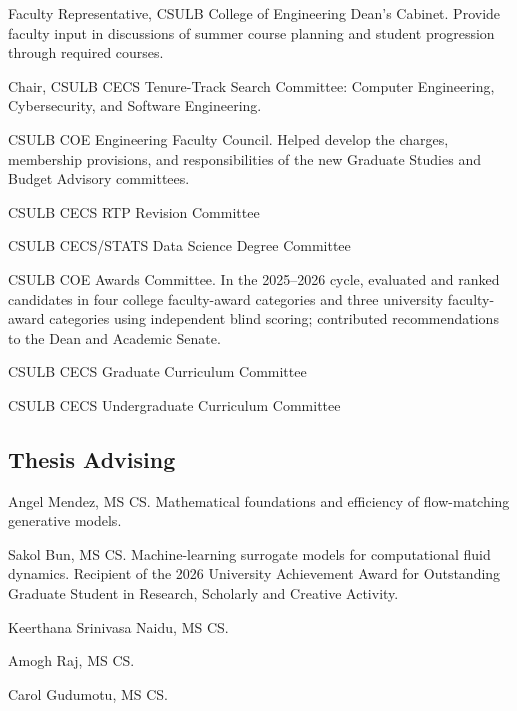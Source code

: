 \documentclass[11pt,letterpaper]{report}
\begin{document}
    \begin{tablist}[leftmargin=2.4cm,labelwidth=2.1cm]
        \item[2026--present] Faculty Representative, CSULB College of Engineering Dean's Cabinet. Provide faculty input in discussions of summer course planning and student progression through required courses.
        \item[2025--2026] Chair, CSULB CECS Tenure-Track Search Committee: Computer Engineering, Cybersecurity, and Software Engineering.
        \item[2025] CSULB COE Engineering Faculty Council. Helped develop the charges, membership provisions, and responsibilities of the new Graduate Studies and Budget Advisory committees.
        \item[2025]  CSULB CECS RTP Revision Committee
        \item[2024] CSULB CECS/STATS Data Science Degree Committee
        \item[2024--2026] CSULB COE Awards Committee. In the 2025--2026 cycle, evaluated and ranked candidates in four college faculty-award categories and three university faculty-award categories using independent blind scoring; contributed recommendations to the Dean and Academic Senate.
        \item[2024, 2025] CSULB CECS Graduate Curriculum Committee
        \item[2023] CSULB CECS Undergraduate Curriculum Committee

    \end{tablist}

    \subsection*{Thesis Advising}

    \begin{tablist}
        \item[2026] \tab{} Angel Mendez, MS CS. Mathematical foundations and efficiency of flow-matching generative models.
        \item[2026] \tab{} Sakol Bun, MS CS. Machine-learning surrogate models for computational fluid dynamics. Recipient of the 2026 University Achievement Award for Outstanding Graduate Student in Research, Scholarly and Creative Activity.
		\item[2024] \tab{}Keerthana Srinivasa Naidu, MS CS. 
	 \item[2024] \tab{}Amogh Raj, MS CS. 
     \item[2023] \tab{}Carol Gudumotu, MS CS. 


    \end{tablist}
\end{document}
